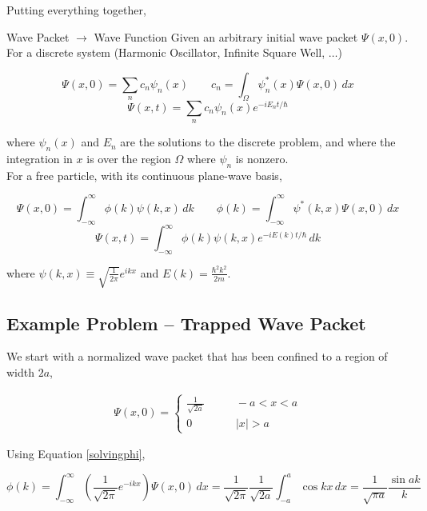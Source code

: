 Putting everything together, 

\begin{mainbox}{Wave Packet $\rightarrow$ Wave Function}
  Given an arbitrary initial wave packet $\Psi(x, 0)$. \\

  For a discrete system (Harmonic Oscillator, Infinite Square Well,  $\hdots$)

   \[
  \Psi(x, 0) = \sum_n c_n \psi_n(x) \qquad c_n = \int_\Omega \psi_n^*(x)\Psi(x,
  0) \, dx
  \] \[ \Psi(x, t) = \sum_n c_n \psi_n(x) e^{-iE_n t/\hbar} \] \vspace{3px}
  
where $\psi_n(x)$ and $E_n$ are the solutions to the discrete problem, and
where the integration in $x$ is over the region $\Omega$ where $\psi_n$ is
nonzero. \\

For a free particle, with its continuous plane-wave basis, 

\[ \Psi(x, 0) = \int_{-\infty}^{\infty} \phi(k)\psi(k, x) \, dk \qquad \phi(k)
= \int_{-\infty}^{\infty} \psi^*(k, x)\Psi(x, 0) \, dx \] \[ \Psi(x, t)
= \int_{-\infty}^{\infty} \phi(k)\psi(k, x) e^{-iE(k) t /\hbar} \, dk \]
\vspace{3px}
  
where $\psi(k, x) \equiv \sqrt{\frac{1}{2\pi}} e^{ikx}$ and $E(k)
= \frac{\hbar^2 k^2}{2m}$.
\end{mainbox}


\subsection{Example Problem -- Trapped Wave Packet} 

We start with a normalized wave packet that has been confined to a region of
width $2a$, 

\begin{align} \label{problemfree}
\Psi(x, 0) = \begin{cases}
  \frac{1}{\sqrt{2a}} &\qquad -a < x < a \\ 0 &\qquad |x| > a
\end{cases}
\end{align} \vspace{3px}

Using Equation \ref{solvingphi}, 

\[
  \phi(k) = \int_{-\infty}^{\infty} \left( \frac{1}{\sqrt{2\pi}}e^{-ikx}
  \right) \Psi(x, 0) \, dx = \frac{1}{\sqrt{2\pi}}\frac{1}{\sqrt{2a}}
  \int_{-a}^{a} \cos kx \, dx = \frac{1}{\sqrt{\pi a}} \frac{\sin ak}{k}
\] \vspace{3px}

